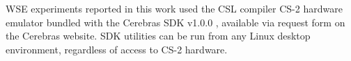 WSE experiments reported in this work used the CSL compiler CS-2 hardware emulator bundled with the Cerebras SDK v1.0.0 \citep{selig2022cerebras}, available via request form on the Cerebras website.
SDK utilities can be run from any Linux desktop environment, regardless of access to CS-2 hardware.

